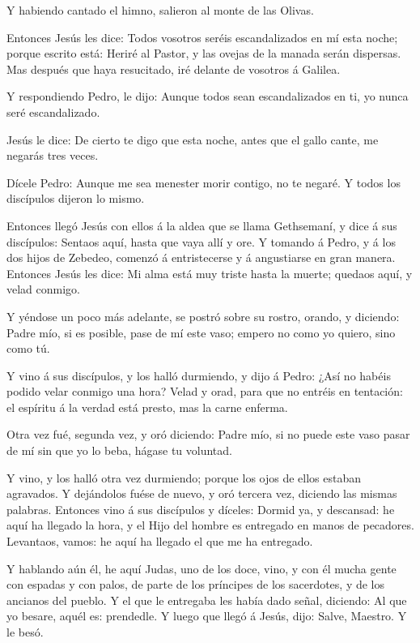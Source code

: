  Y habiendo cantado el himno, salieron al monte de las
Olivas.

 Entonces Jesús les dice: Todos vosotros seréis
escandalizados en mí esta noche; porque escrito está: Heriré al Pastor,
y las ovejas de la manada serán dispersas.  Mas después que
haya resucitado, iré delante de vosotros á Galilea.

 Y respondiendo Pedro, le dijo: Aunque todos sean
escandalizados en ti, yo nunca seré escandalizado.

 Jesús le dice: De cierto te digo que esta noche, antes que
el gallo cante, me negarás tres veces.

 Dícele Pedro: Aunque me sea menester morir contigo, no te
negaré. Y todos los discípulos dijeron lo mismo.

 Entonces llegó Jesús con ellos á la aldea que se llama
Gethsemaní, y dice á sus discípulos: Sentaos aquí, hasta que vaya allí y
ore.  Y tomando á Pedro, y á los dos hijos de Zebedeo,
comenzó á entristecerse y á angustiarse en gran manera. 
Entonces Jesús les dice: Mi alma está muy triste hasta la muerte;
quedaos aquí, y velad conmigo.

 Y yéndose un poco más adelante, se postró sobre su rostro,
orando, y diciendo: Padre mío, si es posible, pase de mí este vaso;
empero no como yo quiero, sino como tú.

 Y vino á sus discípulos, y los halló durmiendo, y dijo á
Pedro: ¿Así no habéis podido velar conmigo una hora?  Velad
y orad, para que no entréis en tentación: el espíritu á la verdad está
presto, mas la carne enferma.

 Otra vez fué, segunda vez, y oró diciendo: Padre mío, si
no puede este vaso pasar de mí sin que yo lo beba, hágase tu voluntad.

 Y vino, y los halló otra vez durmiendo; porque los ojos de
ellos estaban agravados.  Y dejándolos fuése de nuevo, y
oró tercera vez, diciendo las mismas palabras.  Entonces
vino á sus discípulos y díceles: Dormid ya, y descansad: he aquí ha
llegado la hora, y el Hijo del hombre es entregado en manos de
pecadores.  Levantaos, vamos: he aquí ha llegado el que me
ha entregado.

 Y hablando aún él, he aquí Judas, uno de los doce, vino, y
con él mucha gente con espadas y con palos, de parte de los príncipes de
los sacerdotes, y de los ancianos del pueblo.  Y el que le
entregaba les había dado señal, diciendo: Al que yo besare, aquél es:
prendedle.  Y luego que llegó á Jesús, dijo: Salve,
Maestro. Y le besó.

